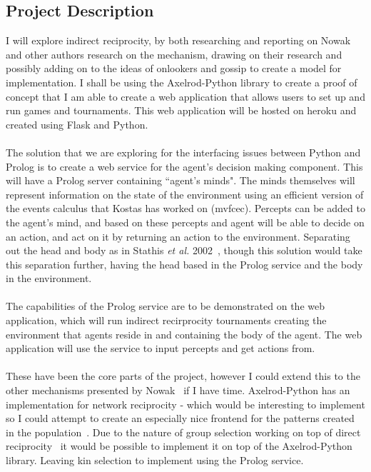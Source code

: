 \documentclass{article}
\begin{document}
\subsection*{Project Description}
I will explore indirect reciprocity, by both researching and reporting on Nowak and other authors research on the mechanism, drawing on their research and possibly adding on to the ideas of onlookers and gossip to create a model for implementation. I shall be using the Axelrod-Python library to create a proof of concept that I am able to create a web application that allows users to set up and run games and tournaments. This web application will be hosted on heroku and created using Flask and Python.\\\\
The solution that we are exploring for the interfacing issues between Python and Prolog is to create a web service for the agent's decision making component. This will have a Prolog server containing ``agent's minds". The minds themselves will represent information on the state of the environment using an efficient version of the events calculus that Kostas has worked on (mvfcec). Percepts can be added to the agent's mind, and based on these percepts and agent will be able to decide on an action, and act on it by returning an action to the environment. Separating out the head and body as in Stathis \textit{et al.} 2002~\cite{prosocs}, though this solution would take this separation further, having the head based in the Prolog service and the body in the environment.\\\\
The capabilities of the Prolog service are to be demonstrated on the web application, which will run indirect recirprocity tournaments creating the environment that agents reside in and containing the body of the agent. The web application will use the service to input percepts and get actions from.\\\\
These have been the core parts of the project, however I could extend this to the other mechanisms presented by Nowak~\cite{five_rules_coop} if I have time. Axelrod-Python has an implementation for network reciprocity - which would be interesting to implement so I could attempt to create an especially nice frontend for the patterns created in the population~\cite{spatial}. Due to the nature of group selection working on top of direct reciprocity~\cite{multilevel_nowak} it would be possible to implement it on top of the Axelrod-Python library. Leaving kin selection to implement using the Prolog service.
\end{document}
